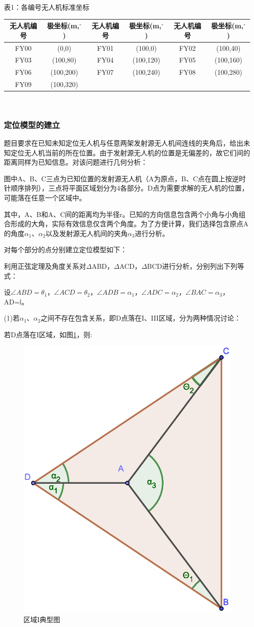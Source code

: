 \documentclass{ctexart}
\begin{document}
\begin{center}
  表1：各编号无人机标准坐标
  ~\\
    \begin{tabular}{|c|c|c|c|c|c|}
        \hline
        无人机编号&极坐标(m,$^{\circ}$)&无人机编号&极坐标(m,$^{\circ}$)&无人机编号&极坐标(m,$^{\circ}$)\\
        \hline
        FY00&(0,0)&FY01&(100,0)&FY02&(100,40)\\
        \hline
        FY03&(100,80)&FY04&(100,120)&FY05&(100,160)\\
        \hline
        FY06&(100,200)&FY07&(100,240)&FY08&(100,280)\\
        \hline
        FY09&(100,320)& & & &\\    

        \hline
    \end{tabular}\\
\end{center}
\subsubsection{定位模型的建立}
题目要求在已知未知定位无人机与任意两架发射源无人机间连线的夹角后，给出未知定位无人机当前的所在位置。由于发射源无人机的位置是无偏差的，故它们间的距离同样为已知信息。对该问题进行几何分析：

图中A、B、C三点为已知位置的发射源无人机（A为原点，B、C点在圆上按逆时针顺序排列），三点将平面区域划分为4各部分。D点为需要求解的无人机的位置，可能落在任意一个区域中。

其中，A、B和A、C间的距离均为半径r。已知的方向信息包含两个小角与小角组合形成的大角，实际有效信息仅含两个角度。为了方便计算，我们选择包含原点A的角度$\alpha_1$、$\alpha_2$以及发射源无人机间的夹角$\alpha_3$进行分析。

对每个部分的点分别建立定位模型如下：

利用正弦定理及角度关系对$\Delta$ABD，$\Delta$ACD，$\Delta$BCD进行分析，分别列出下列等式：

设$\angle ABD=\theta_1$，$\angle ACD=\theta_2$，$\angle ADB=\alpha_1$，$\angle ADC=\alpha_2$，$\angle BAC=\alpha_3$，AD=l。

(1)若$\alpha_1$、$\alpha_2$之间不存在包含关系，即D点落在I、III区域，分为两种情况讨论：

若D点落在I区域，如图\ref{区域I典型图}，则:

\begin{figure}[htbp]
  \centering
  \includegraphics[width=0.40\linewidth]{pic/case1++.eps}
  \caption{区域I典型图}
  \label{区域I典型图}
  \end{figure} 
\end{document}
